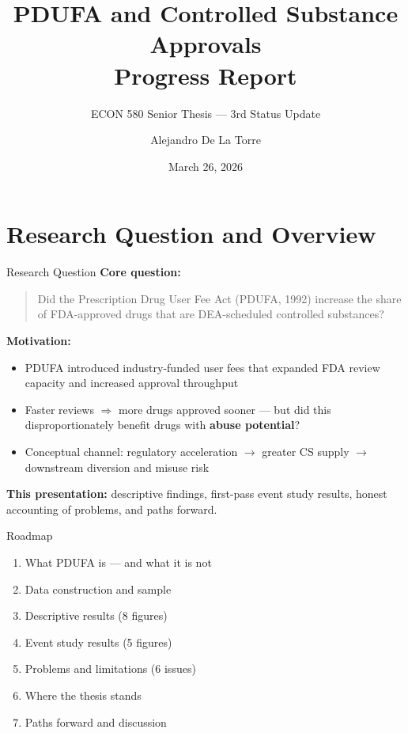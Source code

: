 \documentclass[10pt]{beamer}
\title[PDUFA \& CS Approvals]%
      {PDUFA and Controlled Substance Approvals\\[0.3em]
       \large Progress Report}
\subtitle{ECON 580 Senior Thesis --- 3rd Status Update}
\author{Alejandro De La Torre}
\date{March 26, 2026}
\institute{Department of Economics\\University of Wisconsin--Madison}
\begin{document}

\begin{frame}
  \titlepage
\end{frame}

\section{Research Question and Overview}

\begin{frame}[t]{Research Question}
  \textbf{Core question:}
  \begin{quote}
    Did the Prescription Drug User Fee Act (PDUFA, 1992) increase the share of
    FDA-approved drugs that are DEA-scheduled controlled substances?
  \end{quote}

  \medskip
  \textbf{Motivation:}
  \begin{itemize}
    \item PDUFA introduced industry-funded user fees that expanded FDA review
          capacity and increased approval throughput
    \item Faster reviews $\Rightarrow$ more drugs approved sooner --- but did
          this disproportionately benefit drugs with \textbf{abuse potential}?
    \item Conceptual channel: regulatory acceleration $\to$ greater CS supply
          $\to$ downstream diversion and misuse risk
  \end{itemize}

  \medskip
  \textbf{This presentation:} descriptive findings, first-pass event study
  results, honest accounting of problems, and paths forward.
\end{frame}

\begin{frame}[t]{Roadmap}
  \begin{enumerate}
    \item What PDUFA is --- and what it is not
    \item Data construction and sample
    \item Descriptive results (8 figures)
    \item Event study results (5 figures)
    \item Problems and limitations (6 issues)
    \item Where the thesis stands
    \item Paths forward and discussion
  \end{enumerate}
\end{frame}
\end{document}

